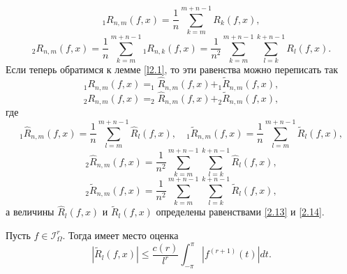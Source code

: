 $$
_1R_{n,m}(f,x)=\frac1n\sum_{k=m}^{m+n-1}R_k(f,x),
$$
$$
_2R_{n,m}(f,x)=\frac1n\sum_{k=m}^{m+n-1}
{_1}R_{n,k}(f,x)=\frac1{n^2}\sum_{k=m}^{m+n-1}
\sum_{l=k}^{k+n-1}R_l(f,x).
$$
Если теперь обратимся к лемме \ref{l2.1}, то эти равенства можно переписать так
\begin{equation}\label{2.17}
_1R_{n,m}(f,x)=_1\hat R_{n,m}(f,x)+_1\tilde R_{n,m}(f,x),
\end{equation}
\begin{equation}\label{2.18}
_2R_{n,m}(f,x)=_2\hat R_{n,m}(f,x)+_2\tilde R_{n,m}(f,x),
\end{equation}
где
\begin{equation}\label{2.19}
_1\hat R_{n,m}(f,x)=\frac1{n}
\sum_{l=m}^{m+n-1}\hat R_l(f,x),\quad_1\tilde R_{n,m}(f,x)=\frac1{n}
\sum_{l=m}^{m+n-1}\tilde R_l(f,x),
\end{equation}
\begin{equation}\label{2.20}
_2\hat R_{n,m}(f,x)=\frac1{n^2}\sum_{k=m}^{m+n-1}
\sum_{l=k}^{k+n-1}\hat R_l(f,x),
\end{equation}
\begin{equation}\label{2.21}
_2\tilde R_{n,m}(f,x)=\frac1{n^2}\sum_{k=m}^{m+n-1}
\sum_{l=k}^{k+n-1}\tilde R_l(f,x),
\end{equation}
 а величины $\hat R_l(f,x)$  и $\tilde R_l(f,x)$ определены равенствами \eqref{2.13} и \eqref{2.14}.
\begin{lemma}\label{l2.2}
Пусть $f\in \mathcal{ I}^r_\Omega$. Тогда имеет место оценка
\begin{equation}\label{2.22}
|\tilde R_l(f,x)|\le \frac{c(r)}{l^{r}}\int_{-\pi}^{\pi}|f^{(r+1)}(t)|dt.
\end{equation}
\end{lemma}

